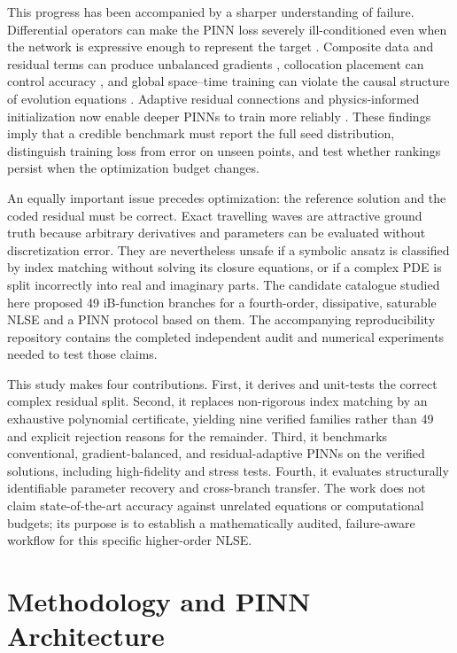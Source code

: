 \documentclass[11pt]{article}
\begin{document}
This progress has been accompanied by a sharper understanding of failure.
Differential operators can make the PINN loss severely ill-conditioned even
when the network is expressive enough to represent the target
\citep{krishnapriyan2021,rathore2024}.  Composite data and residual terms can
produce unbalanced gradients \citep{wang2021}, collocation placement can
control accuracy \citep{wu2023}, and global space--time training can violate
the causal structure of evolution equations \citep{wang2024causal}.  Adaptive
residual connections and physics-informed initialization now enable deeper
PINNs to train more reliably \citep{wang2024piratenets}.  These findings imply
that a credible benchmark must report the full seed distribution, distinguish
training loss from error on unseen points, and test whether rankings persist
when the optimization budget changes.

An equally important issue precedes optimization: the reference solution and
the coded residual must be correct.  Exact travelling waves are attractive
ground truth because arbitrary derivatives and parameters can be evaluated
without discretization error.  They are nevertheless unsafe if a symbolic
ansatz is classified by index matching without solving its closure equations,
or if a complex PDE is split incorrectly into real and imaginary parts.  The
candidate catalogue studied here \citep{catalogue2026} proposed 49
iB-function branches for a fourth-order, dissipative, saturable NLSE and a PINN
protocol based on them.  The accompanying reproducibility repository contains
the completed independent audit and numerical experiments needed to test those
claims.

This study makes four contributions.  First, it derives and unit-tests the
correct complex residual split.  Second, it replaces non-rigorous index
matching by an exhaustive polynomial certificate, yielding nine verified
families rather than 49 and explicit rejection reasons for the remainder.
Third, it benchmarks conventional, gradient-balanced, and residual-adaptive
PINNs on the verified solutions, including high-fidelity and stress tests.
Fourth, it evaluates structurally identifiable parameter recovery and
cross-branch transfer.  The work does not claim state-of-the-art accuracy
against unrelated equations or computational budgets; its purpose is to
establish a mathematically audited, failure-aware workflow for this specific
higher-order NLSE.

\section{Methodology and PINN Architecture}
\label{sec:methods}
\end{document}
